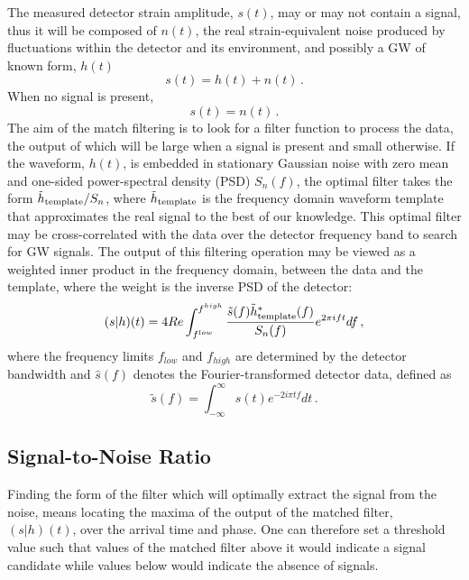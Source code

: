 \documentclass[binding=0.6cm, LaM]{sapthesis}
\begin{document}
	The measured detector strain amplitude, $s(t)$, may or may not contain a signal,
	thus it will be composed of $n(t)$, the real strain-equivalent noise
        produced by fluctuations within the detector and its environment, 
	and possibly a GW of known form, $h(t)$
        \begin{equation}
          \label{eq:strain}        
          s(t) = h(t) + n(t)\,.
        \end{equation}
        When no signal is present,   		
        \begin{equation}
          s(t) = n(t)\,.
        \end{equation}
        The aim of the match filtering is to look for a filter function to process the data,
	the output of which will be large when a signal is present and small otherwise. 
        If the waveform, $h(t)$, is embedded in stationary Gaussian noise with zero mean and one-sided power-spectral density (PSD) $S_n(f)$,
        the optimal filter takes the form $\tilde h_{\rm template}/S_n$, where $\tilde h_{\rm template}$
        is the frequency domain waveform template that approximates the real signal to the best of our knowledge.
	This optimal filter may be cross-correlated with the data over the detector frequency band to search for GW
        signals.  The output of this filtering operation may be viewed as a weighted inner product in the frequency domain, 
	between the data and the template, where the weight is the inverse PSD of the detector:
        \begin{equation}
          (s|h)(t) = 4Re \int^{f^{high}}_{f^{low}} {{\tilde s (f) \tilde h^{*}_{\rm template}(f)} \over {S_n (f)}} e^{2 \pi ift}df\,, 
        \end{equation}
	where the frequency limits $f_{low}$ and $f_{high}$ are determined by the detector bandwidth
	and $\hat s(f)$ denotes the Fourier-transformed detector data, defined as
        \begin{equation}
          \tilde s(f) = \int^{\infty}_{-\infty} s(t) e^{-2i \pi tf} dt\,.
        \end{equation}
        
\subsection{Signal-to-Noise Ratio}
	Finding the form of the filter which will optimally extract the signal from the noise,
        means locating the maxima of the output of the matched filter, $(s|h)(t)$, 
	over the arrival time and phase.
        One can therefore set a threshold value such that values of the matched filter 
	above it would indicate a signal candidate while values below would indicate the absence of signals.
\end{document}
